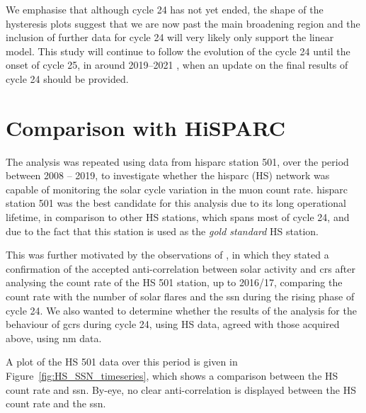 We emphasise that although cycle 24 has not yet ended, the shape of the hysteresis plots suggest that we are now past the main broadening region and the inclusion of further data for cycle 24 will very likely only support the linear model. This study will continue to follow the evolution of the cycle 24 until the onset of cycle 25, in around 2019--2021 \citep{howe_signatures_2018, upton_updated_2018, pesnell_early_2018}, when an update on the final results of cycle 24 should be provided.







\section{Comparison with HiSPARC}\label{sec:HS_vs_SSN}

The analysis was repeated using data from \gls{hisparc} station 501, over the period between 2008 -- 2019, to investigate whether the \gls{hisparc} (HS) network was capable of monitoring the solar cycle variation in the muon count rate. \gls{hisparc} station 501 was the best candidate for this analysis due to its long operational lifetime, in comparison to other HS stations, which spans most of cycle 24, and due to the fact that this station is used as the {\it gold standard} HS station. 

This was further motivated by the observations of \citet{fan_analysis_2018}, in which they stated a confirmation of the accepted anti-correlation between solar activity and \glspl{cr} after analysing the count rate of the HS 501 station, up to 2016/17, comparing the count rate with the number of solar flares and the \gls{ssn} during the rising phase of cycle 24. We also wanted to determine whether the results of the analysis for the behaviour of \glspl{gcr} during cycle 24, using HS data, agreed with those acquired above, using \gls{nm} data.

A plot of the HS 501 data over this period is given in Figure~\ref{fig:HS_SSN_timeseries}, which shows a comparison between the HS count rate and \gls{ssn}. By-eye, no clear anti-correlation is displayed between the HS count rate and the \gls{ssn}.

